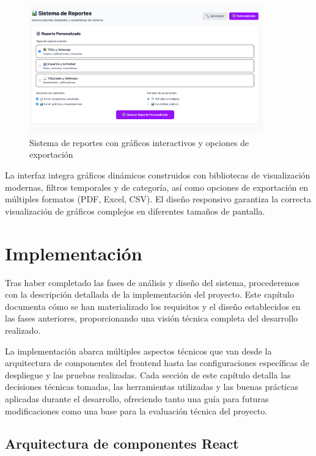\documentclass[12pt,a4paper,oneside]{report}
\begin{document}
\begin{figure}[H]
\centering
\includegraphics[width=0.9\textwidth]{processed/images/sistema_reportes.png}
\caption{Sistema de reportes con gráficos interactivos y opciones de exportación}
\label{fig:sistema-reportes}
\end{figure}

La interfaz integra gráficos dinámicos construidos con bibliotecas de visualización modernas, filtros temporales y de categoría, así como opciones de exportación en múltiples formatos (PDF, Excel, CSV). El diseño responsivo garantiza la correcta visualización de gráficos complejos en diferentes tamaños de pantalla.

\chapter{Implementación}\label{implementaciuxf3n}
Tras haber completado las fases de análisis y diseño del sistema,
procederemos con la descripción detallada de la implementación del
proyecto. Este capítulo documenta cómo se han materializado los
requisitos y el diseño establecidos en las fases anteriores,
proporcionando una visión técnica completa del desarrollo realizado.

La implementación abarca múltiples aspectos técnicos que van desde la
arquitectura de componentes del frontend hasta las configuraciones
específicas de despliegue y las pruebas realizadas. Cada sección de este
capítulo detalla las decisiones técnicas tomadas, las herramientas
utilizadas y las buenas prácticas aplicadas durante el desarrollo,
ofreciendo tanto una guía para futuras modificaciones como una base para
la evaluación técnica del proyecto.

\section{Arquitectura de componentes
React}\label{arquitectura-de-componentes-react-1}
\end{document}
